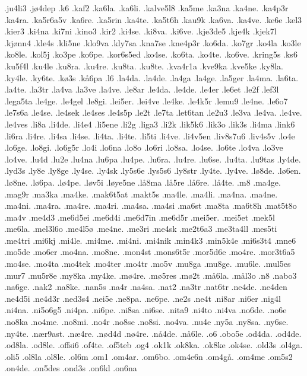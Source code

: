 {.ju4li3
.jø4dep
.k6
.kaf2
.ka6la.
.ka6li.
.kalve5l8
.ka5me
.ka3na
.ka4ne.
.ka4p3r
.ka4ra.
.ka5r6a5v
.ka6re.
.ka5rin
.ka4te.
.ka5t6h
.kau9k
.ka6va.
.ka4ve.
.ke6e
.kel3
.kier3
.ki4na
.ki7ni
.kino3
.kir2
.ki4se.
.ki8va.
.ki6ve.
.kje3de5
.kje4k
.kjek7l
.kjønn4
.kle4s
.kli5ne
.klo9va
.kly7sa
.kna7se
.kne4p3r
.ko6da.
.ko7gr
.ko4la
.ko3le
.ko8le.
.kol5j
.ko3pe
.ko6pe.
.kor6s5ed
.ko4se.
.ko6ta.
.ko4te.
.ko6ve.
.kring5s
.ks6
.ku5f4l
.ku4le
.ku8ra.
.ku4re.
.ku8ta.
.ku8te.
.kva4r1a
.kve9ka
.kve5ke
.ky8la.
.ky4le.
.ky6te.
.kø3s
.kå6pa
.l6
.la4da.
.la4de.
.la4ga
.la4ge.
.la5ger
.la4ma.
.la6ta.
.la4te.
.la3tr
.la4va
.la3ve
.la4ve.
.le8ar
.le4da.
.le4de.
.le4er
.le6et
.le2f
.lef3l
.lega5ta
.le4ge.
.le4gel
.le8gi.
.lei5er.
.lei4ve
.le4ke.
.le4k5r
.lemu9
.le4ne.
.le6o7
.le7s6a
.le4se.
.le4sek
.le4ses
.le4s5p
.le2t
.le7ta
.let6tan
.le2u3
.le3va
.le4va.
.le4ve.
.le4ves
.li8a
.li4de.
.li4e4
.li5ene
.li2g
.liga3
.li2k
.lik5k6
.lik3o
.lik3s
.li4ma
.link6
.li6ra
.li4re.
.li4sa
.li4se.
.li4ta.
.li4te.
.li5ti
.li4ve.
.li4v5en
.liv8s7u6
.liv4s5v
.lo4e
.lo6ge.
.lo8gi.
.lo6g5r
.lo4i
.lo6na
.lo8o
.lo6ri
.lo8sa.
.lo4se.
.lo6te
.lo4va
.lo3ve
.lo4ve.
.lu4d
.lu2e
.lu4na
.lu6pa
.lu4pe.
.lu6ra.
.lu4re.
.lu6se.
.lu4ta.
.lu9tas
.ly4de.
.lyd3s
.ly8e
.ly8ge
.ly4se.
.ly4sk
.ly5s6e
.lys5s6
.ly8str
.ly4te.
.ly4ve.
.lø8de.
.lø6en.
.lø8ne.
.lø6pa.
.lø4pe.
.løv5i
.løye5ne
.lå8ma
.lå5re
.lå6re.
.lå4te.
.m8
.ma4ge.
.mag9r
.ma3ka
.ma4ke.
.mak6t5at
.makt5s
.ma4le.
.ma4li.
.ma4na.
.ma4ne.
.ma4ni.
.ma4ra.
.ma4re.
.ma4ri.
.ma4sa.
.ma4si
.ma6st
.ma8ta
.ma6t8h
.mat5t8o
.ma4v
.me4d3
.me6d5ei
.me6d4i
.me6d7in
.me6d5r
.mei5er.
.mei5et
.mek5l
.me6la.
.mel3l6o
.me4l5ø
.me4ne.
.me3ri
.me4sk
.me2t6a3
.me3ta4ll
.mes5ti
.me4tri
.mi6kj
.mi4le.
.mi4me.
.mi4ni.
.mi4nik
.min4k3
.min5k4e
.mi6s3t4
.mne6
.mo5de
.mo6er
.mo4na.
.mo8ne.
.mon4st
.mons6t5r
.mor5d6e
.mo4re.
.mor3t6a5
.mo4se.
.mo4ta
.mo4tek
.mo4ter
.mo4tr
.mo5v
.mu8ga
.mu8ge.
.mu6le.
.mul5es
.mur7
.mu5r8e
.my8ka
.my4ke.
.mø4re.
.mø5res
.mø2t
.må6la.
.mål3o
.n8
.nabo3
.na6ge.
.nak2
.na8ke.
.nan5s
.na4r
.na4sa.
.nat2
.na3tr
.nat6tr
.ne4de.
.ne4den
.ne4d5i
.ne4d3r
.ned3s4
.nei5e
.ne8pa.
.ne6pe.
.ne2s
.ne4t
.ni8ar
.ni6er
.nig4l
.ni4na.
.ni5o6g5
.ni4pa.
.ni6pe.
.ni8sa
.ni6se.
.nita9
.ni4to
.ni4va
.no6de.
.no6e
.no8ka
.no4me.
.no8mi.
.no4r
.no8se
.no8si.
.no4va.
.nu4e
.ny5a
.ny8sa.
.ny6se.
.ny4te.
.nær9ast.
.næ4re.
.nød4d
.nø4re.
.nå4de.
.nå6le.
.o6
.obo5e
.od4da.
.od4de.
.od8la.
.od8le.
.offsi6
.of4te.
.of5teb
.og4
.ok1k
.ok8ka.
.ok8ke
.ok4se.
.old3s
.ol4ga.
.oli5
.ol8la
.ol8le.
.ol6m
.om1
.om4ar.
.om6bo.
.om4e6n
.om4gå.
.om4me
.om5s2
.on4de.
.on5des
.ond3s
.on6kl
.on6na
}
